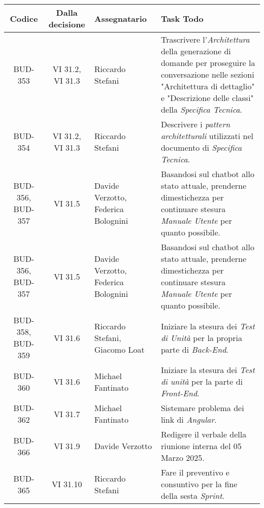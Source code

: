 \begin{table}[htbp]
\begin{tabular}{|c|c|p{}|p{}|}
    \hline
    \rowcolor[gray]{0.75}
    \textbf{Codice} & \textbf{Dalla decisione} & \textbf{Assegnatario} & \textbf{Task Todo} \\
    \hline
    BUD-353 & VI 31.2, VI 31.3 & Riccardo Stefani & Trascrivere l'\emph{Architettura} della generazione di domande per proseguire la conversazione nelle sezioni "Architettura di dettaglio" e "Descrizione delle classi" della \emph{Specifica Tecnica}. \\
    \hline
    BUD-354 & VI 31.2, VI 31.3 & Riccardo Stefani & Descrivere i \emph{pattern architetturali} utilizzati nel documento di \emph{Specifica Tecnica}.\\
    \hline
    BUD-356, BUD-357 & VI 31.5 & Davide Verzotto, Federica Bolognini & Basandosi sul chatbot allo stato attuale, prenderne dimestichezza per continuare stesura \emph{Manuale Utente} per quanto possibile. \\ 
    \hline
    BUD-356, BUD-357 & VI 31.5 & Davide Verzotto, Federica Bolognini & Basandosi sul chatbot allo stato attuale, prenderne dimestichezza per continuare stesura \emph{Manuale Utente} per quanto possibile. \\ 
    \hline
    BUD-358, BUD-359 & VI 31.6 & Riccardo Stefani, Giacomo Loat & Iniziare la stesura dei \emph{Test di Unità} per la propria parte di \emph{Back-End}. \\
    \hline
    BUD-360 & VI 31.6 & Michael Fantinato & Iniziare la stesura dei \emph{Test di unità} per la parte di \emph{Front-End}. \\
    \hline
    BUD-362 & VI 31.7 & Michael Fantinato & Sistemare problema dei link di \emph{Angular}. \\
    \hline
    BUD-366 & VI 31.9 & Davide Verzotto & Redigere il verbale della riunione interna del 05 Marzo 2025. \\
    \hline
    BUD-365 & VI 31.10 & Riccardo Stefani & Fare il preventivo e consuntivo per la fine della sesta \emph{Sprint}. \\
    \hline

\end{tabular}
\end{table}